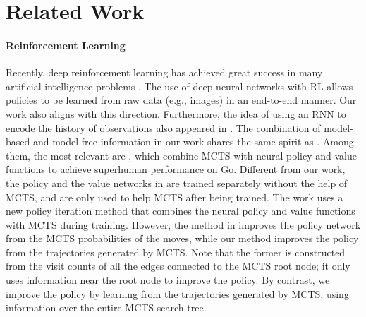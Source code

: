 \documentclass{article}
\begin{document}
	
	
	
	
	
	
	
\section{Related Work}
\label{Sec:RelatedWork}
	
\paragraph{Reinforcement Learning}
	Recently, deep reinforcement learning has achieved great success in many artificial intelligence problems \cite{mnih2015human,silver2016mastering, silver2017mastering}. The use of deep neural networks with RL allows policies to be learned from raw data (e.g., images) in an end-to-end manner. Our work also aligns with this direction. Furthermore, the idea of using an RNN to encode the history of observations also appeared in \cite{HausknechtS15, wierstra2010recurrent}. The combination of  model-based and model-free information in our work shares the same spirit as \cite{silver2016mastering, silver2017mastering, pmlr-v70-silver17a, Imagination-Augmented}. Among them, the most relevant are \cite{silver2016mastering, silver2017mastering}, which combine MCTS with neural policy and value functions to achieve superhuman performance on Go. Different from our work, the policy and the value networks in \cite{silver2016mastering} are trained separately without the help of MCTS, and are only used to help MCTS after being trained. The work \cite{silver2017mastering} uses a new policy iteration method that combines the neural policy and value functions with MCTS during training. However, the method in \cite{silver2017mastering} improves the policy network from the MCTS probabilities of the moves, while our method improves the policy from the trajectories generated by MCTS. Note that the former is constructed from the visit counts of all the edges connected to the MCTS root node; it only uses information near the root node to improve the policy. By contrast, we improve the policy by learning from the trajectories generated by MCTS, using information over the entire MCTS search tree.
	
\end{document}
